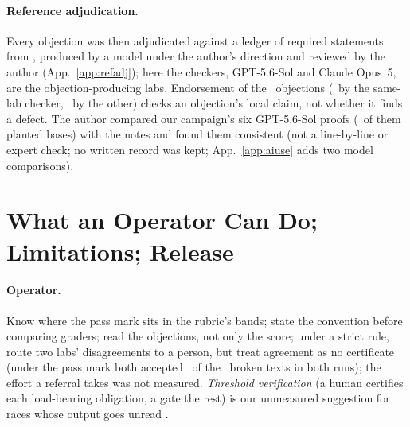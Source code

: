 \documentclass{article}
\begin{document}
\paragraph{Reference adjudication.} Every objection was then adjudicated against a ledger of required statements from \citet{chen2026notes}, produced by a model under the author's direction and reviewed by the author (App.~\ref{app:refadj}); here the checkers, GPT-5.6-Sol and Claude Opus~5, are the objection-producing labs. Endorsement of the \REFADJN\ objections (\REFADJENDORSESAME\ by the same-lab checker, \REFADJENDORSEOTHER\ by the other) checks an objection's local claim, not whether it finds a defect. The author compared our campaign's six GPT-5.6-Sol proofs (\CRBasesGPTOurs\ of them planted bases) with the notes and found them consistent (not a line-by-line or expert check; no written record was kept; App.~\ref{app:aiuse} adds two model comparisons).

\section{What an Operator Can Do; Limitations; Release}
\label{sec:operator}\label{sec:limitations}

\paragraph{Operator.} Know where the pass mark sits in the rubric's bands; state the convention before comparing graders; read the objections, not only the score; under a strict rule, route two labs' disagreements to a person, but treat agreement as no certificate (under the pass mark both accepted \CRPassBrokenAccP\ of the \CRNBroken\ broken texts in both runs); the effort a referral takes was not measured. \emph{Threshold verification} (a human certifies each load-bearing obligation, a gate the rest) is our unmeasured suggestion for races whose output goes unread \citep{tao2026benchmarks}.
\end{document}

